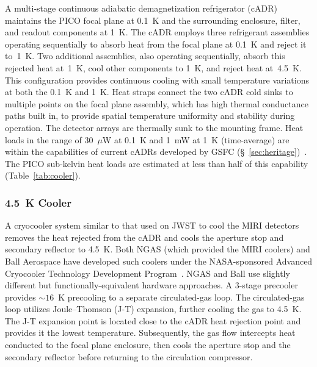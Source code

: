 A multi-stage continuous adiabatic demagnetization refrigerator (cADR) maintains the PICO focal plane at 0.1~K and the surrounding enclosure, filter, and readout components at 1~K. The cADR employs three refrigerant assemblies operating sequentially to absorb heat from the focal plane at 0.1~K and reject it to~1~K. Two additional assemblies, also operating sequentially, absorb this rejected heat at~1~K, cool other components to 1~K, and reject heat at~4.5~K. This configuration provides continuous cooling with small temperature variations at both the 0.1~K and 1~K. Heat straps connect the two cADR cold sinks to multiple points on the focal plane assembly,
which has high thermal conductance paths built in, to provide spatial temperature uniformity and stability during operation. The detector arrays are thermally sunk to the mounting frame.  Heat loads in the range of 30~$\mu$W at 0.1~K and 1~mW at 1~K (time-average) are within the capabilities of current cADRs developed by GSFC (\S~\ref{sec:heritage})~\citep{Shirron2012,Shirron2016}. The PICO sub-kelvin heat loads are estimated at less than half of this capability (Table~\ref{tab:cooler}).

\subsubsection{4.5~K Cooler}
\label{sec:4kcooler} %

A cryocooler system similar to that used on JWST to cool the MIRI detectors~\citep{Durand2008,Rabb2013} removes the heat rejected from the cADR and cools the aperture stop and secondary reflector to 4.5~K. Both NGAS (which provided the MIRI coolers) and Ball Aerospace have developed such coolers under the NASA-sponsored Advanced Cryocooler Technology Development Program~\citep{Glaister2006}. NGAS and Ball use slightly different but functionally-equivalent hardware approaches. A 3-stage precooler provides $\sim16$~K precooling to a separate circulated-gas loop.
The circulated-gas loop utilizes Joule--Thomson (J-T) expansion, further cooling the gas to 4.5~K.
The J-T expansion point is located close to the cADR heat rejection point and provides it the lowest temperature. Subsequently, the gas flow intercepts heat conducted to the focal plane enclosure, then cools the aperture stop and the secondary reflector before returning to the circulation compressor.  %

